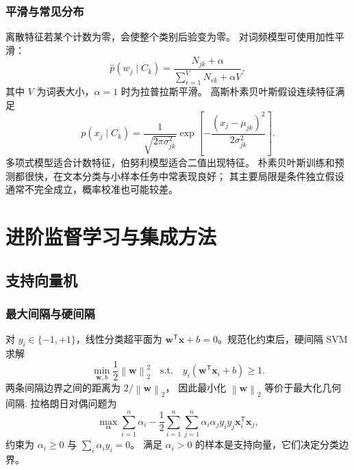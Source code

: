 \documentclass[UTF8,zihao=-4,a4paper,fontset=windows]{ctexart}
\newcommand{\norm}[1]{\left\lVert #1\right\rVert}
\begin{document}
\subsubsection{平滑与常见分布}

离散特征若某个计数为零，会使整个类别后验变为零。
对词频模型可使用加性平滑：
\begin{equation}
  \hat p(w_j\mid C_k)
  =\frac{N_{jk}+\alpha}
  {\sum_{r=1}^{V}N_{rk}+\alpha V},
\end{equation}
其中 $V$ 为词表大小，$\alpha=1$ 时为拉普拉斯平滑。
高斯朴素贝叶斯假设连续特征满足
\begin{equation}
  p(x_j\mid C_k)
  =\frac{1}{\sqrt{2\pi\sigma_{jk}^2}}
  \exp\left[-\frac{(x_j-\mu_{jk})^2}{2\sigma_{jk}^2}\right].
\end{equation}
多项式模型适合计数特征，伯努利模型适合二值出现特征。
朴素贝叶斯训练和预测都很快，在文本分类与小样本任务中常表现良好；
其主要局限是条件独立假设通常不完全成立，概率校准也可能较差。

\section{进阶监督学习与集成方法}

\subsection{支持向量机}

\subsubsection{最大间隔与硬间隔}

对 $y_i\in\{-1,+1\}$，线性分类超平面为
$\bm{w}^{\mathsf T}\bm{x}+b=0$。规范化约束后，硬间隔 SVM 求解
\begin{equation}
  \min_{\bm{w},b}\frac{1}{2}\norm{\bm{w}}_2^2
  \quad
  \text{s.t.}\quad
  y_i(\bm{w}^{\mathsf T}\bm{x}_i+b)\ge 1.
  \label{eq:svm-primal}
\end{equation}
两条间隔边界之间的距离为 $2/\norm{\bm{w}}_2$，
因此最小化 $\norm{\bm{w}}_2$ 等价于最大化几何间隔\cite{cortes}.
拉格朗日对偶问题为
\begin{equation}
  \max_{\bm{\alpha}}
  \sum_{i=1}^{n}\alpha_i
  -\frac{1}{2}\sum_{i=1}^{n}\sum_{j=1}^{n}
  \alpha_i\alpha_j y_i y_j
  \bm{x}_i^{\mathsf T}\bm{x}_j,
\end{equation}
约束为 $\alpha_i\ge0$ 与 $\sum_i\alpha_i y_i=0$。
满足 $\alpha_i>0$ 的样本是支持向量，它们决定分类边界。
\end{document}
